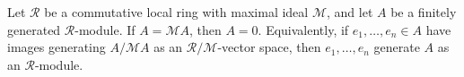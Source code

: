 Let $\mathcal{R}$ be a commutative local ring with maximal ideal $\mathcal{M}$, and let $A$ be a finitely generated $\mathcal{R}$-module. If $A = \mathcal{M}A$, then $A = 0$. Equivalently, if $e_1, \ldots, e_n \in A$ have images generating $A/\mathcal{M}A$ as an $\mathcal{R}/\mathcal{M}$-vector space, then $e_1, \ldots, e_n$ generate $A$ as an $\mathcal{R}$-module.
